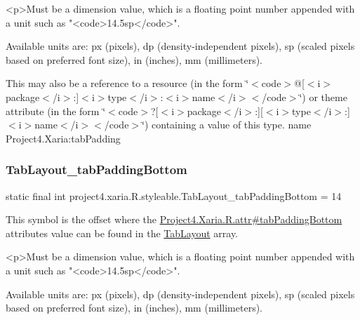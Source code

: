 \begin{DoxyVerb}      <p>Must be a dimension value, which is a floating point number appended with a unit such as "<code>14.5sp</code>".
\end{DoxyVerb}
 Available units are\+: px (pixels), dp (density-\/independent pixels), sp (scaled pixels based on preferred font size), in (inches), mm (millimeters). 

This may also be a reference to a resource (in the form \char`\"{}$<$code$>$@\mbox{[}$<$i$>$package$<$/i$>$\+:\mbox{]}$<$i$>$type$<$/i$>$\+:$<$i$>$name$<$/i$>$$<$/code$>$\char`\"{}) or theme attribute (in the form \char`\"{}$<$code$>$?\mbox{[}$<$i$>$package$<$/i$>$\+:\mbox{]}\mbox{[}$<$i$>$type$<$/i$>$\+:\mbox{]}$<$i$>$name$<$/i$>$$<$/code$>$\char`\"{}) containing a value of this type.  name Project4.\+Xaria\+:tab\+Padding \mbox{\label{classproject4_1_1xaria_1_1R_1_1styleable_a0482d61a95e5a8235145359e07653b15}} 
\subsubsection{\texorpdfstring{Tab\+Layout\+\_\+tab\+Padding\+Bottom}{TabLayout\_tabPaddingBottom}}
{\footnotesize\ttfamily static final int project4.\+xaria.\+R.\+styleable.\+Tab\+Layout\+\_\+tab\+Padding\+Bottom = 14\hspace{0.3cm}{\ttfamily [static]}}

This symbol is the offset where the \hyperlink{}{Project4.\+Xaria.\+R.\+attr\#tab\+Padding\+Bottom} attribute\textquotesingle{}s value can be found in the \hyperlink{classproject4_1_1xaria_1_1R_1_1styleable_ab6bfb1f97ae9fba16f4f90d50871d4a8}{Tab\+Layout} array.

\begin{DoxyVerb}      <p>Must be a dimension value, which is a floating point number appended with a unit such as "<code>14.5sp</code>".
\end{DoxyVerb}
 Available units are\+: px (pixels), dp (density-\/independent pixels), sp (scaled pixels based on preferred font size), in (inches), mm (millimeters). 

